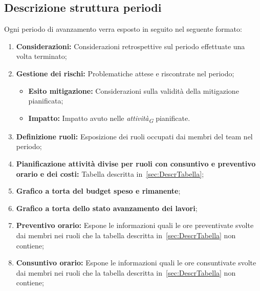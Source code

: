 \subsection{Descrizione struttura periodi}
Ogni periodo di avanzamento verra esposto in seguito nel seguente formato:
\begin{enumerate}
    \item \textbf{Considerazioni:} Considerazioni retrospettive sul periodo effettuate una volta terminato;
    \item \textbf{Gestione dei rischi:} Problematiche attese e riscontrate nel periodo;
        \begin{itemize}
            \item \textbf{Esito mitigazione:} Considerazioni sulla validità della mitigazione pianificata;
            \item \textbf{Impatto:} Impatto avuto nelle \textit{attività}\textsubscript{\textit{G}} pianificate.
        \end{itemize}
    \item \textbf{Definizione ruoli:} Esposizione dei ruoli occupati dai membri del team nel periodo;
    \item \textbf{Pianificazione attività divise per ruoli con consuntivo e preventivo orario e dei costi:} Tabella descritta in~\ref{sec:DescrTabella}; 
    \item \textbf{Grafico a torta del budget speso e rimanente};
    \item \textbf{Grafico a torta dello stato avanzamento dei lavori};
    \item \textbf{Preventivo orario:} Espone le informazioni quali le ore preventivate svolte dai membri nei ruoli che la tabella descritta in~\ref{sec:DescrTabella} non contiene; 
    \item \textbf{Consuntivo orario:} Espone le informazioni quali le ore consuntivate svolte dai membri nei ruoli che la tabella descritta in~\ref{sec:DescrTabella} non contiene; 


\end{enumerate}
